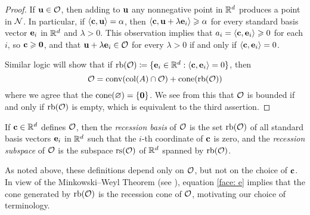 \documentclass[11pt]{amsart}
\begin{document}
\begin{proof}
   If $\mathbf{u} \in \mathcal{O}$, then adding to $\mathbf{u}$ any nonnegative point in $\mathbb{R}^d$ produces a point in $\mathcal{N}$.
   In particular, if $\langle \mathbf{c}, \mathbf{u} \rangle = \alpha$, then $\langle \mathbf{c}, \mathbf{u} + \lambda \mathbf{e}_i \rangle \geqslant \alpha$ for every standard basis vector $\mathbf{e}_i$ in $\mathbb{R}^d$ and $\lambda > 0$.
   This observation implies that $a_i = \langle \mathbf{c}, \mathbf{e}_i \rangle \geqslant 0$ for each $i$, so $\mathbf{c} \geqslant \mathbf{0}$, and that $\mathbf{u} + \lambda \mathbf{e}_i \in \mathcal{O}$ for every $\lambda > 0$ if and only if $\langle \mathbf{c}, \mathbf{e}_i \rangle = 0$.  

Similar logic will show that if $\operatorname{rb}(\mathcal{O}) \coloneqq  \{ \mathbf{e}_i \in \mathbb{R}^d : \langle \mathbf{c}, \mathbf{e}_i \rangle = 0\}$, then 
\begin{equation}
\label{face: e}
\mathcal{O} =  \operatorname{conv}( \operatorname{col}(A) \cap \mathcal{O} ) + \operatorname{cone}(\operatorname{rb}(\mathcal{O}))
\end{equation}
where we agree that the $\operatorname{cone}(\varnothing) = \{\mathbf{0}\}$.  We see from this that $\mathcal{O}$ is bounded if and only if $\operatorname{rb}(\mathcal{O})$ is empty, which is equivalent to the third assertion.  
\end{proof}

\begin{definition}
   If $\mathbf{c} \in \mathbb{R}^d$ defines $\mathcal{O}$, then the \emph{recession basis} of $\mathcal{O}$ is the set $\operatorname{rb}(\mathcal{O})$ of all standard basis vectors $\mathbf{e}_i$ in $\mathbb{R}^d$ such that the $i$-th coordinate of $\mathbf{c}$ is zero, and the \emph{recession subspace} of $\mathcal{O}$ is the subspace $\operatorname{rs}(\mathcal{O})$ of $\mathbb{R}^d$ spanned by $\operatorname{rb}(\mathcal{O})$.  
\end{definition}

As noted above, these definitions depend only on $\mathcal{O}$, but not on the choice of $\mathbf{c}$.
In view of the Minkowski--Weyl Theorem (see ), equation \eqref{face: e} implies that the cone generated by $\operatorname{rb}(\mathcal{O})$ is the recession cone of $\mathcal{O}$, motivating our choice of terminology.
\end{document}
